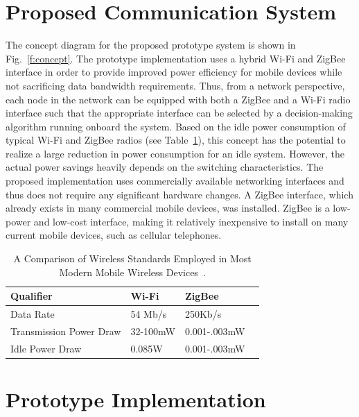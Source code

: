 \documentclass[conference]{IEEEtran}
\begin{document}
\section{Proposed Communication System}
The concept diagram for the proposed prototype system is shown in
Fig.~\ref{f:concept}.  The prototype implementation uses a hybrid
Wi-Fi and ZigBee interface in order to provide improved power
efficiency for mobile devices while not sacrificing data bandwidth
requirements. Thus, from a network perspective, each node in the
network can be equipped with both a ZigBee and a Wi-Fi radio
interface such that the appropriate interface can be selected by a
decision-making algorithm running onboard the system.  Based on the
idle power consumption of typical Wi-Fi and ZigBee radios (see
Table~\ref{t:table1}), this concept has the potential to realize a
large reduction in power consumption for an idle system.  However,
the actual power savings heavily depends on the switching
characteristics. The proposed implementation uses commercially
available networking interfaces and thus does not require any
significant hardware changes. A ZigBee interface, which already
exists in many commercial mobile devices, was installed. ZigBee is a
low-power and low-cost interface, making it relatively inexpensive
to install on many current mobile devices, such as cellular
telephones. \setcounter{table}{0}
\begin{table}[t]
\caption{A Comparison of Wireless Standards Employed in Most Modern
Mobile Wireless Devices~\cite{eight,six,nine,ten,eleven,fourteen}.}
\begin{center}
\begin{tabular}{llll}
\hline
Qualifier & Wi-Fi & ZigBee\\
\hline
Data Rate & 54 Mb/s & 250Kb/s\\
Transmission Power Draw & 32-100mW & 0.001-.003mW\\
Idle Power Draw & 0.085W & 0.001-.003mW\\
\hline
\end{tabular}
\end{center}
\label{t:table1}
\end{table}

\section{Prototype Implementation}
\end{document}
